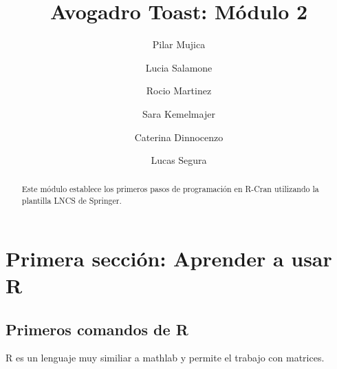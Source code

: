 \documentclass[]{llncs}
\newenvironment{Shaded}{\begin{snugshade}}{\end{snugshade}}
\newcommand{\AttributeTok}[1]{\textcolor[rgb]{0.13,0.29,0.53}{#1}}
\newcommand{\CommentTok}[1]{\textcolor[rgb]{0.56,0.35,0.01}{\textit{#1}}}
\newcommand{\ConstantTok}[1]{\textcolor[rgb]{0.56,0.35,0.01}{#1}}
\newcommand{\FunctionTok}[1]{\textcolor[rgb]{0.13,0.29,0.53}{\textbf{#1}}}
\newcommand{\NormalTok}[1]{#1}
\newcommand{\SpecialCharTok}[1]{\textcolor[rgb]{0.81,0.36,0.00}{\textbf{#1}}}
\newcommand{\StringTok}[1]{\textcolor[rgb]{0.31,0.60,0.02}{#1}}
\begin{document}
\title{Avogadro Toast: Módulo 2}
%
%
\author{Pilar Mujica\inst{} \and Lucia Salamone\inst{} \and Rocio
Martinez\inst{} \and Sara Kemelmajer\inst{} \and Caterina
Dinnocenzo\inst{} \and Lucas Segura\inst{}}


\authorrunning{}
%


\maketitle              %
%
\begin{abstract}
Este módulo establece los primeros pasos de programación en R-Cran
utilizando la plantilla LNCS de Springer.


\end{abstract}

\begin{Shaded}
\end{Shaded}

\section{Primera sección: Aprender a usar
R}\label{primera-secciuxf3n-aprender-a-usar-r}

\subsection{Primeros comandos de R}\label{primeros-comandos-de-r}

R es un lenguaje muy similiar a mathlab y permite el trabajo con
matrices.
\end{document}
